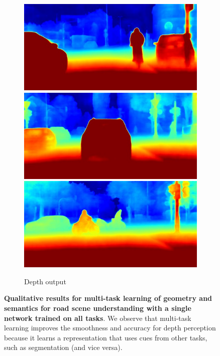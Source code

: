 \begin{figure}[t]
{\begin{subfigure}[t]{0.24\linewidth}
\begin{center}
		\includegraphics[width=\linewidth,trim={0px 60px 0 0px},clip]{qualitative/bonn_000045_000019_depth_prediction.jpg}
		\includegraphics[width=\linewidth,trim={0px 60px 0 0px},clip]{qualitative/munich_000021_000019_depth_prediction.jpg}
		\includegraphics[width=\linewidth,trim={0px 60px 0 0px},clip]{qualitative/munich_000042_000019_depth_prediction.jpg}
  \caption{Depth output}
\end{center}
\end{subfigure}}
	\caption[Qualitative results.]{\textbf{Qualitative results for multi-task learning of geometry and semantics for road scene understanding with a single network trained on all tasks}. We observe that multi-task learning improves the smoothness and accuracy for depth perception because it learns a representation that uses cues from other tasks, such as segmentation (and vice versa).}
	\label{fig:cityscapesqual}
\end{figure}


